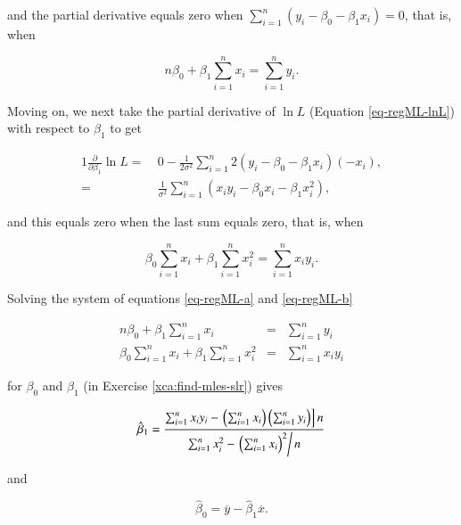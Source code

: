 \documentclass[]{book}
\numberwithin{equation}{chapter}
\numberwithin{figure}{chapter}
\theoremstyle{plain}
\theoremstyle{definition}
\theoremstyle{remark}
\theoremstyle{definition}
\theoremstyle{definition}
\theoremstyle{remark}
\begin{document}
and the partial derivative equals zero when
\(\sum_{i=1}^{n}(y_{i}-\beta_{0}-\beta_{1}x_{i}) = 0\), that is, when

\begin{equation}
\label{eq-regML-a}
n \beta_{0} + \beta_{1} \sum_{i=1}^{n} x_{i} = \sum_{i = 1}^{n}y_{i}.
\end{equation}

Moving on, we next take the partial derivative of \(\ln L\) (Equation
\eqref{eq-regML-lnL}) with respect to \(\beta_{1}\) to get

\begin{alignat}{1}
\frac{\partial}{\partial \beta_{1}} \ln L = \ & 0 - \frac{1}{2\sigma^{2}} \sum_{i=1}^{n} 2 (y_{i} - \beta_{0} - \beta_{1} x_{i})(-x_{i}),\\ = & \frac{1}{\sigma^{2}}\sum_{i = 1}^{n}\left(x_{i} y_{i} - \beta_{0}x_{i} - \beta_{1}x_{i}^{2}\right),
\end{alignat}

and this equals zero when the last sum equals zero, that is, when

\begin{equation}
\label{eq-regML-b}
\beta_{0} \sum_{i = 1}^{n}x_{i} + \beta_{1} \sum_{i = 1}^{n}x_{i}^{2} = \sum_{i = 1}^{n}x_{i}y_{i}.
\end{equation}

Solving the system of equations \eqref{eq-regML-a} and
\eqref{eq-regML-b}

\begin{eqnarray}
n\beta_{0} + \beta_{1}\sum_{i = 1}^{n}x_{i} & = & \sum_{i = 1}^{n}y_{i}\\
\beta_{0}\sum_{i = 1}^{n}x_{i}+\beta_{1}\sum_{i = 1}^{n}x_{i}^{2} & = & \sum_{i = 1}^{n}x_{i}y_{i}
\end{eqnarray}

for \(\beta_{0}\) and \(\beta_{1}\) (in Exercise
\ref{xca:find-mles-slr}) gives

\begin{equation}
\label{eq-regline-slope-formula}
\hat{\beta}_{1} = \frac{\sum_{i = 1}^{n}x_{i}y_{i} - \left.\left(\sum_{i = 1}^{n}x_{i}\right)\left(\sum_{i = 1}^{n}y_{i}\right)\right] n}{\sum_{i = 1}^{n}x_{i}^{2} - \left.\left(\sum_{i = 1}^{n}x_{i}\right)^{2}\right/ n}
\end{equation}

and

\begin{equation}
\hat{\beta}_{0} = \overline{y} - \hat{\beta}_{1}\overline{x}.
\end{equation}
\end{document}

